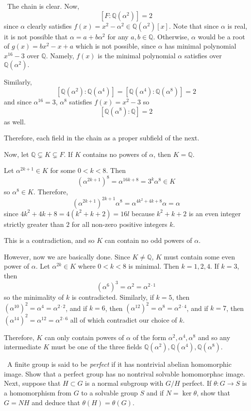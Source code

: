 \documentclass[12pt]{Qual}
\begin{document}
\begin{solution}$\,$
The chain is clear. Now, $$[F:\mathbb{Q}(\alpha^2)]=2$$ since $\alpha$ clearly satisfies $f(x)=x^2-\alpha^2\in\mathbb{Q}(\alpha^2)[x]$. Note that since $\alpha$ is real, it is not possible that $\alpha=a+b\alpha^2$ for any $a,b\in\mathbb{Q}$. Otherwise, $\alpha$ would be a root of $g(x)=bx^2-x+a$ which is not possible, since $\alpha$ has minimal polynomial $x^{16}-3$ over $\mathbb{Q}$. Namely, $f(x)$ is the minimal polynomial $\alpha$ satisfies over $\mathbb{Q}(\alpha^2).$

Similarly, $$[\mathbb{Q}(\alpha^2):\mathbb{Q}(\alpha^4)]=[\mathbb{Q}(\alpha^4):\mathbb{Q}(\alpha^8)]=2$$ and since $\alpha^{16}=3$, $\alpha^8$ satisfies $f(x)=x^2-3$ so $$[\mathbb{Q}(\alpha^8):\mathbb{Q}]=2$$ as well.

Therefore, each field in the chain as a proper subfield of the next.

Now, let $\mathbb{Q}\subsetneq K\subsetneq F$. If $K$ contains no powers of $\alpha$, then $K=\mathbb{Q}$.

Let $\alpha^{2k+1}\in K$ for some $0<k<8$. Then $$(\alpha^{2k+1})^8=\alpha^{16k+8}=3^k\alpha^8\in K$$ so $\alpha^8\in K$. Therefore, $$(\alpha^{2k+1})^{2k+1}\alpha^8=\alpha^{4k^2+4k+8}\alpha=\alpha$$ since $4k^2+4k+8=4(k^2+k+2)=16l$ because $k^2+k+2$ is an even integer strictly greater than $2$ for all non-zero positive integers $k$.

This is a contradiction, and so $K$ can contain no odd powers of $\alpha$.

However, now we are basically done. Since $K\not=\mathbb{Q}$, $K$ must contain some even power of $\alpha$. Let $\alpha^{2k}\in K$ where $0<k<8$ is minimal. Then $k=1,2,4$.  If $k=3$, then $$(\alpha^6)^3=\alpha^2=\alpha^{2\cdot 1}$$ so the minimality of $k$ is contradicted. Similarly, if $k=5$, then $(\alpha^{10})^2=\alpha^4=\alpha^{2\cdot 2}$, and if $k=6$, then $(\alpha^{12})^2=\alpha^8=\alpha^{2\cdot 4}$, and if $k=7$, then $(\alpha^{14})^2=\alpha^{12}=\alpha^{2\cdot 6}$ all of which contradict our choice of $k.$

Therefore, $K$ can only contain powers of $\alpha$ of the form $\alpha^2,\alpha^4,\alpha^8$ and so any intermediate $K$ must be one of the three fields $\mathbb{Q}(\alpha^2),\mathbb{Q}(\alpha^4),\mathbb{Q}(\alpha^8)$.

\end{solution}
\newpage



\begin{problem} $\,$
A finite group is said to be \textit{perfect} if it has nontrivial abelian homomorphic image. Show that a perfect group has no nontrival solvable homomorphac image. Next, suppose that $H\subset G$ is a normal subgroup with $G/H$ perfect. If $\theta:G\to S$ is a homomorphism from $G$ to a solvable group $S$ and if $N=\ker\theta$, show that $G=NH$ and deduce that $\theta(H)=\theta(G)$.
\end{problem}
\end{document}
